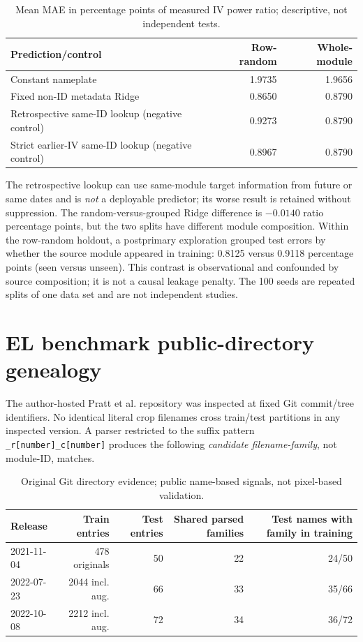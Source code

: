 \documentclass[10pt,a4paper]{article}
\begin{document}
\begin{table}[ht]\centering\small
\caption{Mean MAE in percentage points of measured IV power ratio; descriptive, not independent tests.}
\begin{tabularx}{\linewidth}{@{}Xrr@{}}\toprule
Prediction/control & Row-random & Whole-module \\\midrule
Constant nameplate & 1.9735 & 1.9656 \\
Fixed non-ID metadata Ridge & 0.8650 & 0.8790 \\
Retrospective same-ID lookup (negative control) & 0.9273 & 0.8790 \\
Strict earlier-IV same-ID lookup (negative control) & 0.8967 & 0.8790 \\
\bottomrule\end{tabularx}
\end{table}

The retrospective lookup can use same-module target information from future or same dates and is \emph{not} a deployable predictor; its worse result is retained without suppression. The random-versus-grouped Ridge difference is $-0.0140$ ratio percentage points, but the two splits have different module composition. Within the row-random holdout, a postprimary exploration grouped test errors by whether the source module appeared in training: 0.8125 versus 0.9118 percentage points (seen versus unseen). This contrast is observational and confounded by source composition; it is not a causal leakage penalty. The 100 seeds are repeated splits of one data set and are not independent studies.

\section{EL benchmark public-directory genealogy}
The author-hosted Pratt et al. repository was inspected at fixed Git commit/tree identifiers. No identical literal crop filenames cross train/test partitions in any inspected version. A parser restricted to the suffix pattern \texttt{\_r[number]\_c[number]} produces the following \emph{candidate filename-family}, not module-ID, matches.
\begin{table}[ht]\centering\small
\caption{Original Git directory evidence; public name-based signals, not pixel-based validation.}
\begin{tabularx}{\linewidth}{@{}Xrrrr@{}}\toprule
Release & Train entries & Test entries & Shared parsed families & Test names with family in training \\\midrule
2021-11-04 & 478 originals & 50 & 22 & 24/50 \\
2022-07-23 & 2044 incl. aug. & 66 & 33 & 35/66 \\
2022-10-08 & 2212 incl. aug. & 72 & 34 & 36/72 \\
\bottomrule\end{tabularx}
\end{table}
\end{document}
